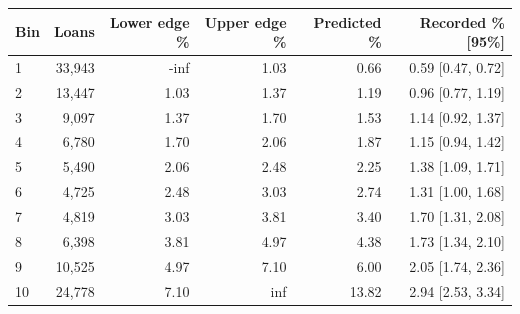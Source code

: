 \begingroup\small\setlength{\tabcolsep}{3pt}
\begin{tabularx}{\linewidth}{Xrrrrr}\toprule
Bin & Loans & Lower edge \% & Upper edge \% & Predicted \% & Recorded \% [95\%] \\ \midrule
1 & 33,943 & -inf & 1.03 & 0.66 & 0.59 [0.47, 0.72] \\
2 & 13,447 & 1.03 & 1.37 & 1.19 & 0.96 [0.77, 1.19] \\
3 & 9,097 & 1.37 & 1.70 & 1.53 & 1.14 [0.92, 1.37] \\
4 & 6,780 & 1.70 & 2.06 & 1.87 & 1.15 [0.94, 1.42] \\
5 & 5,490 & 2.06 & 2.48 & 2.25 & 1.38 [1.09, 1.71] \\
6 & 4,725 & 2.48 & 3.03 & 2.74 & 1.31 [1.00, 1.68] \\
7 & 4,819 & 3.03 & 3.81 & 3.40 & 1.70 [1.31, 2.08] \\
8 & 6,398 & 3.81 & 4.97 & 4.38 & 1.73 [1.34, 2.10] \\
9 & 10,525 & 4.97 & 7.10 & 6.00 & 2.05 [1.74, 2.36] \\
10 & 24,778 & 7.10 & inf & 13.82 & 2.94 [2.53, 3.34] \\
\bottomrule\end{tabularx}\endgroup
